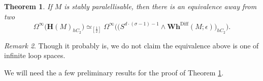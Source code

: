 \documentclass[a4paper, oneside]{amsart}
\newcommand{\diff}{\mathrm{Diff}}
\newcommand{\1}{\mathds{1}}
\newtheorem{thm}{Theorem}[section]%
\theoremstyle{remark}
\newtheorem{rem}[thm]{Remark}%
\theoremstyle{definition}
\newcommand{\leqs}{\scaleobj{0.85}{\leq}}
\newcommand{\s}{\mathbb{S}}
\newcommand{\Hsp}{\mathbf{H}}
\newcommand{\Whsp}{\mathbf{Wh}^{\diff}}
\numberwithin{equation}{section}
\begin{document}







\begin{thm}\label{absolutepropTWWvsTepsilon}
If $M$ is stably paralellisable, then there is an equivalence away from two
$$
\Omega^\infty\big(\Hsp(M)_{hC_2}\big)\simeq_{[\frac12]}\Omega^\infty\big(\big(S^{d\cdot(\sigma-1)-1}\wedge\Whsp(M;\epsilon)\big)_{hC_2}\big).
$$
\end{thm}


\begin{rem}
Though it probably is, we do not claim the equivalence above is one of infinite loop spaces. 
\end{rem}


 We will need the a few preliminary results for the proof of Theorem \ref{absolutepropTWWvsTepsilon}.
\end{document}

